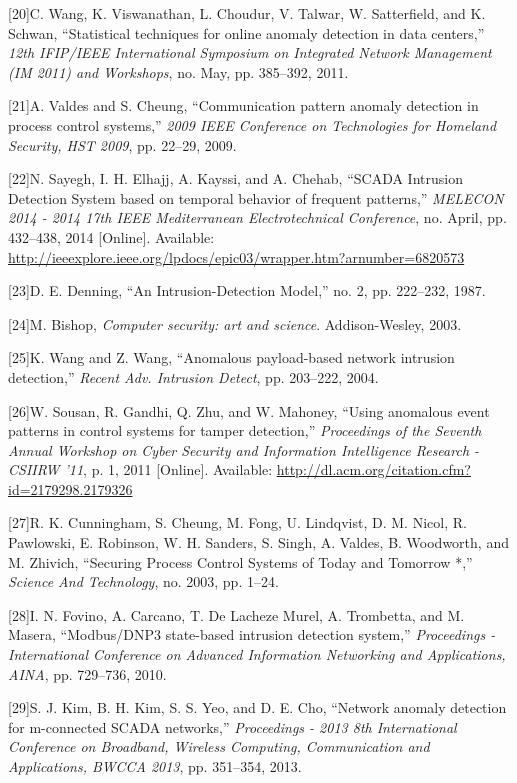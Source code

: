 \documentclass[11pt,]{article}
\begin{document}
{[}20{]}C. Wang, K. Viswanathan, L. Choudur, V. Talwar, W. Satterfield,
and K. Schwan, ``Statistical techniques for online anomaly detection in
data centers,'' \emph{12th IFIP/IEEE International Symposium on
Integrated Network Management (IM 2011) and Workshops}, no. May, pp.
385--392, 2011.

{[}21{]}A. Valdes and S. Cheung, ``Communication pattern anomaly
detection in process control systems,'' \emph{2009 IEEE Conference on
Technologies for Homeland Security, HST 2009}, pp. 22--29, 2009.

{[}22{]}N. Sayegh, I. H. Elhajj, A. Kayssi, and A. Chehab, ``SCADA
Intrusion Detection System based on temporal behavior of frequent
patterns,'' \emph{MELECON 2014 - 2014 17th IEEE Mediterranean
Electrotechnical Conference}, no. April, pp. 432--438, 2014
{[}Online{]}. Available:
\url{http://ieeexplore.ieee.org/lpdocs/epic03/wrapper.htm?arnumber=6820573}

{[}23{]}D. E. Denning, ``An Intrusion-Detection Model,'' no. 2, pp.
222--232, 1987.

{[}24{]}M. Bishop, \emph{Computer security: art and science}.
Addison-Wesley, 2003.

{[}25{]}K. Wang and Z. Wang, ``Anomalous payload-based network intrusion
detection,'' \emph{Recent Adv. Intrusion Detect}, pp. 203--222, 2004.

{[}26{]}W. Sousan, R. Gandhi, Q. Zhu, and W. Mahoney, ``Using anomalous
event patterns in control systems for tamper detection,''
\emph{Proceedings of the Seventh Annual Workshop on Cyber Security and
Information Intelligence Research - CSIIRW '11}, p. 1, 2011
{[}Online{]}. Available:
\url{http://dl.acm.org/citation.cfm?id=2179298.2179326}

{[}27{]}R. K. Cunningham, S. Cheung, M. Fong, U. Lindqvist, D. M. Nicol,
R. Pawlowski, E. Robinson, W. H. Sanders, S. Singh, A. Valdes, B.
Woodworth, and M. Zhivich, ``Securing Process Control Systems of Today
and Tomorrow *,'' \emph{Science And Technology}, no. 2003, pp. 1--24.

{[}28{]}I. N. Fovino, A. Carcano, T. {De Lacheze Murel}, A. Trombetta,
and M. Masera, ``Modbus/DNP3 state-based intrusion detection system,''
\emph{Proceedings - International Conference on Advanced Information
Networking and Applications, AINA}, pp. 729--736, 2010.

{[}29{]}S. J. Kim, B. H. Kim, S. S. Yeo, and D. E. Cho, ``Network
anomaly detection for m-connected SCADA networks,'' \emph{Proceedings -
2013 8th International Conference on Broadband, Wireless Computing,
Communication and Applications, BWCCA 2013}, pp. 351--354, 2013.
\end{document}
